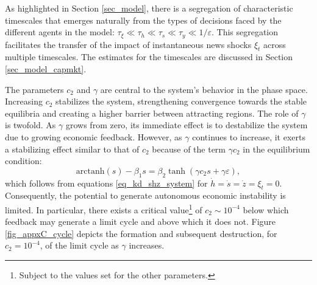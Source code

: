 As highlighted in Section \ref{sec_model}, there is a segregation of characteristic timescales that emerges naturally from the types of decisions faced by the different agents in the model: $\tau_\xi\ll\tau_h\ll\tau_s\ll\tau_y\ll1/\varepsilon$. This segregation facilitates the transfer of the impact of instantaneous news shocks $\xi_t$ across multiple timescales. The estimates for the timescales are discussed in Section \ref{sec_model_capmkt}.

The parameters $c_2$ and $\gamma$ are central to the system's behavior in the phase space. Increasing $c_2$ stabilizes the system, strengthening convergence towards the stable equilibria and creating a higher barrier between attracting regions. The role of $\gamma$ is twofold. As $\gamma$ grows from zero, its immediate effect is to destabilize the system due to growing economic feedback. However, as $\gamma$ continues to increase, it exerts a stabilizing effect similar to that of $c_2$ because of the term $\gamma c_2$ in the equilibrium condition: 
\begin{equation}\label{eq_kd_equilibrium_condition}
\textrm{arctanh}(s)-\beta_1s = \beta_2\tanh\left(\gamma c_2s + \gamma\varepsilon\right), 
\end{equation}
which follows from equations \eqref{eq_kd_shz_system} for $\dot{h}=\dot{s}=\dot{z}=\xi_t=0$. Consequently, the potential to generate autonomous economic instability is limited. In particular, there exists a critical value\footnote{
	Subject to the values set for the other parameters.
} of $c_2\sim10^{-4}$ below which feedback may generate a limit cycle and above which it does not. Figure \ref{fig_appxC_cycle} depicts the formation and subsequent destruction, for $c_2=10^{-4}$, of the limit cycle as $\gamma$ increases.

